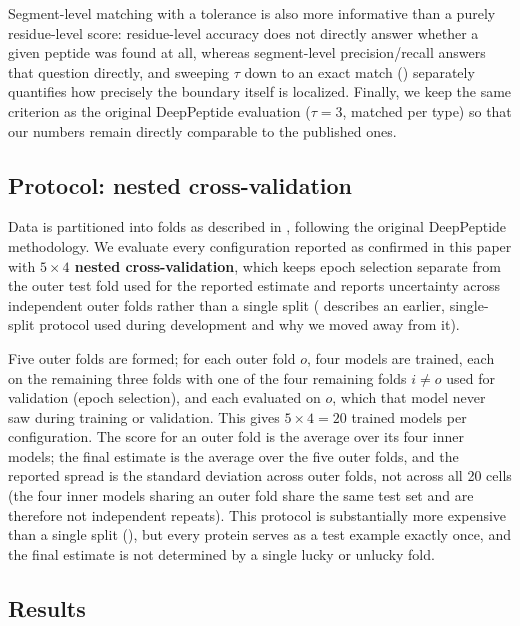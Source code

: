 \documentclass{article}
\begin{document}
Segment-level matching with a tolerance is also more informative than a purely residue-level score: residue-level accuracy does not directly answer whether a given peptide was found at all, whereas segment-level precision/recall answers that question directly, and sweeping $\tau$ down to an exact match () separately quantifies how precisely the boundary itself is localized. Finally, we keep the same criterion as the original DeepPeptide evaluation ($\tau=3$, matched per type) so that our numbers remain directly comparable to the published ones.

\subsection{Protocol: nested cross-validation}
\label{sec:eval-protocol}

Data is partitioned into folds as described in , following the original DeepPeptide methodology. We evaluate every configuration reported as confirmed in this paper with \textbf{$5\times4$ nested cross-validation}, which keeps epoch selection separate from the outer test fold used for the reported estimate and reports uncertainty across independent outer folds rather than a single split ( describes an earlier, single-split protocol used during development and why we moved away from it).

Five outer folds are formed; for each outer fold $o$, four models are trained, each on the remaining three folds with one of the four remaining folds $i \ne o$ used for validation (epoch selection), and each evaluated on $o$, which that model never saw during training or validation. This gives $5\times4=20$ trained models per configuration. The score for an outer fold is the average over its four inner models; the final estimate is the average over the five outer folds, and the reported spread is the standard deviation across outer folds, not across all 20 cells (the four inner models sharing an outer fold share the same test set and are therefore not independent repeats). This protocol is substantially more expensive than a single split (), but every protein serves as a test example exactly once, and the final estimate is not determined by a single lucky or unlucky fold.

\subsection{Results}
\label{sec:results}
\end{document}
